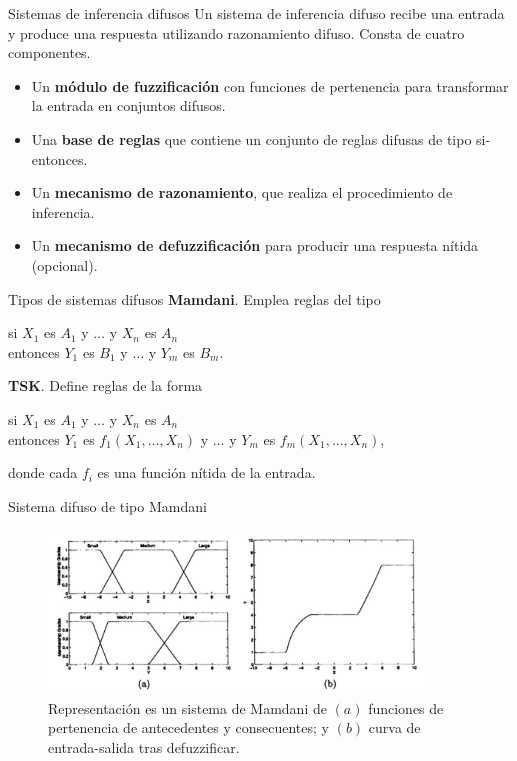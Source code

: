 \documentclass[10pt, spanish]{beamer}
\begin{document}
\begin{frame}{Sistemas de inferencia difusos}
	Un sistema de inferencia difuso recibe una entrada y produce una respuesta utilizando razonamiento difuso. Consta de cuatro componentes.

	\begin{itemize}
	\item Un \textbf{módulo de fuzzificación} con funciones de pertenencia para transformar la entrada en conjuntos difusos.
	\item Una \textbf{base de reglas} que contiene un conjunto de reglas difusas de tipo si-entonces.
	\item Un \textbf{mecanismo de razonamiento}, que realiza el procedimiento de inferencia.
  \item Un \textbf{mecanismo de defuzzificación} para producir una respuesta nítida (opcional).
\end{itemize}

\end{frame}

\begin{frame}{Tipos de sistemas difusos}
\textbf{Mamdani}. Emplea reglas del tipo
  \begin{center}
  si $X_1$ es $A_1$ y $\dots$ y $X_n$ es $A_n$\\
  entonces $Y_1$ es $B_1$ y $\dots$ y $Y_m$ es $B_m$.
\end{center}
\vspace{1em}
\pause
\textbf{TSK}. Define reglas de la forma
\begin{center}
  si $X_1$ es $A_1$ y $\dots$ y $X_n$ es $A_n$\\
  entonces $Y_1$ es $f_1(X_1, \dots, X_n)$ y $\dots$ y $Y_m$ es $f_m(X_1, \dots, X_n)$,
\end{center}
    donde cada $f_i$ es una función nítida de la entrada.

\end{frame}

\begin{frame}{Sistema difuso de tipo Mamdani}
\begin{figure}
	\centering
	\includegraphics[width=27em]{img/mamdani}
	\caption{\footnotesize Representación es un sistema de Mamdani de $(a)$ funciones de pertenencia de antecedentes y consecuentes; y $(b)$ curva de entrada-salida tras defuzzificar.}
\end{figure}
\end{frame}
\end{document}
